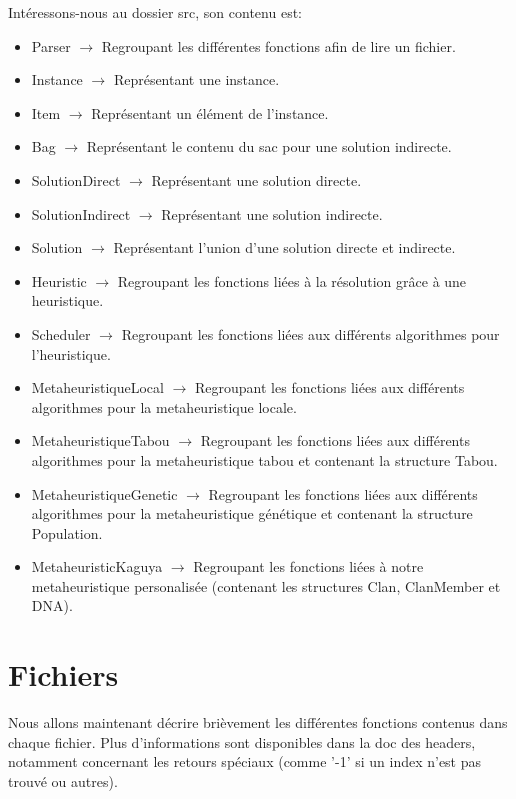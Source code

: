 \documentclass{EPUProjetPeiP}
\begin{document}
Intéressons-nous au dossier src, son contenu est:
\begin{itemize}
	\item Parser $\longrightarrow$ Regroupant les différentes fonctions afin de lire un fichier.
	\item Instance $\longrightarrow$ Représentant une instance.
	\item Item $\longrightarrow$ Représentant un élément de l'instance.
	\item Bag $\longrightarrow$ Représentant le contenu du sac pour une solution indirecte.
	\item SolutionDirect $\longrightarrow$ Représentant une solution directe.
	\item SolutionIndirect $\longrightarrow$ Représentant une solution indirecte.
	\item Solution $\longrightarrow$ Représentant l'union d'une solution directe et indirecte.
	\item Heuristic $\longrightarrow$ Regroupant les fonctions liées à la résolution grâce à une heuristique.
	\item Scheduler $\longrightarrow$ Regroupant les fonctions liées aux différents algorithmes pour l'heuristique.
	\item MetaheuristiqueLocal $\longrightarrow$ Regroupant les fonctions liées aux différents algorithmes pour la metaheuristique locale.
	\item MetaheuristiqueTabou $\longrightarrow$ Regroupant les fonctions liées aux différents algorithmes pour la metaheuristique tabou et contenant la structure Tabou.
	\item MetaheuristiqueGenetic $\longrightarrow$ Regroupant les fonctions liées aux différents algorithmes pour la metaheuristique génétique et contenant la structure Population.
	\item MetaheuristicKaguya $\longrightarrow$ Regroupant les fonctions liées à notre metaheuristique personalisée (contenant les structures Clan, ClanMember et DNA).
\end{itemize}

\chapter{Fichiers}
Nous allons maintenant décrire brièvement les différentes fonctions contenus dans chaque fichier. Plus d'informations sont disponibles dans la doc des headers, notamment concernant les retours spéciaux (comme '-1' si un index n'est pas trouvé ou autres).
\end{document}
